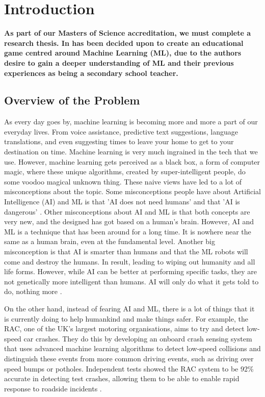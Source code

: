 \chapter{Introduction}
	\label{chap:intro}
	
	\textbf{As part of our Masters of Science accreditation, we must complete a research thesis. In has been decided upon to create an educational game centred around Machine Learning (ML), due to the authors desire to gain a deeper understanding of ML and their previous experiences as being a secondary school teacher.} %
	
	\section{Overview of the Problem}
		\label{sec:overview_of_problem}
		As every day goes by, machine learning is becoming more and more a part of our everyday lives. From voice assistance, predictive text suggestions, language translations, and even suggesting times to leave your home to get to your destination on time. Machine learning is very much ingrained in the tech that we use. However, machine learning gets perceived as a black box, a form of computer magic, where these unique algorithms, created by super-intelligent people, do some voodoo magical unknown thing. These naive views have led to a lot of misconceptions about the topic. Some misconceptions people have about Artificial Intelligence (AI) and ML is that 'AI does not need humans' and that 'AI is dangerous' \cite{quora5misconcepts}. Other misconceptions about AI and ML is that both concepts are very new, and the designed has got based on a human's brain. However, AI and ML is a technique that has been around for a long time. It is nowhere near the same as a human brain, even at the fundamental level. Another big misconception is that AI is smarter than humans and that the ML robots will come and destroy the humans. In result, leading to wiping out humanity and all life forms. However, while AI can be better at performing specific tasks, they are not genetically more intelligent than humans. AI will only do what it gets told to do, nothing more \cite{quora5misconcepts}.
		
		On the other hand, instead of fearing AI and ML, there is a lot of things that it is currently doing to help humankind and make things safer. For example, the RAC, one of the UK's largest motoring organisations, aims to try and detect low-speed car crashes. They do this by developing an onboard crash sensing system that uses advanced machine learning algorithms to detect low-speed collisions and distinguish these events from more common driving events, such as driving over speed bumps or potholes. Independent tests showed the RAC system to be 92\% accurate in detecting test crashes, allowing them to be able to enable rapid response to roadside incidents \cite{matlanintrotoml}.
	
